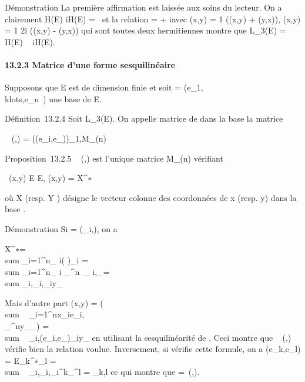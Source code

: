 \documentclass[]{article}
\begin{document}
Démonstration La première affirmation est laissée aux soins du lecteur.
On a clairement H(E) \bigcap iH(E) = \0\ et
la relation \phi = \psi + i\theta avec \psi(x,y) = 1 
(\phi(x,y) + \phi(y,x)), \theta(x,y) = 1 \over 2i (\phi(x,y) -
\phi(y,x)) qui sont toutes deux hermitiennes montre que L\_3(E) =
H(E) \oplus~ iH(E).

\paragraph{13.2.3 Matrice d'une forme sesquilinéaire}

Supposons que E est de dimension finie et soit  =
(e\_1,\\ldots,e\_n~)
une base de E.

Définition~13.2.4 Soit \phi \in L\_3(E). On appelle matrice de \phi
dans la base  la matrice

\mathrmMat~ (\phi,) =
(\phi(e\_i,e\_\jmath))\_1\leqi,\jmath\leqn \in M\_(n)

Proposition~13.2.5
\mathrmMat~ (\phi,) est
l'unique matrice \Omega \in M\_(n) vérifiant

\forall~(x,y) \in E \times E, \phi(x,y) = X^∗~\OmegaY

où X (resp. Y ) désigne le vecteur colonne des coordonnées de x (resp.
y) dans la base .

Démonstration Si \Omega = (\omega\_i,\jmath), on a

X^∗\OmegaY = \\sum
\_i=1^n\overlinex\_ i(\OmegaY
)\_i = \\sum
\_i=1^n\overlinex\_ i
\sum \_^n\omega~\_
i,\jmathy\_\jmath = \\sum
\_i,\jmath\omega\_i,\jmath\overlinex\_iy\_\jmath

Mais d'autre part \phi(x,y) =
\phi(\\sum ~
\_i=1^nx\_ie\_i,\\\sum
 \_^ny\_\jmathe\_\jmath)
= \\sum ~
\_i,\jmath\phi(e\_i,e\_\jmath)\overlinex\_iy\_\jmath
en utilisant la sesquilinéarité de \phi. Ceci montre que
\mathrmMat~ (\phi,) vérifie
bien la relation voulue. Inversement, si \Omega vérifie cette formule, on a
\phi(e\_k,e\_l) = E\_k^∗\OmegaE\_l
= \\sum ~
\_i,\jmath\omega\_i,\jmath\delta\_i^k\delta\_\jmath^l =
\omega\_k,l ce qui montre que \Omega =\
\mathrmMat (\phi,).
\end{document}
